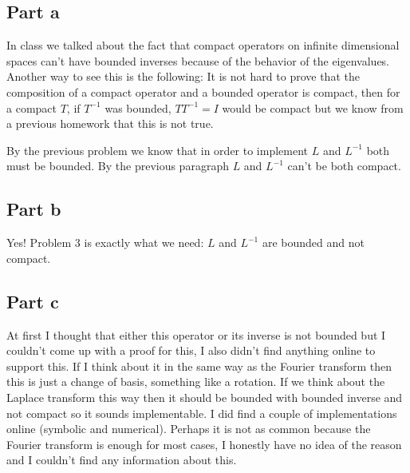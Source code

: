 \documentclass[12pt]{article}%
\begin{document}
\subsection*{Part a}
In class we talked about the fact that compact operators on infinite
dimensional spaces can't have bounded inverses because of the behavior of the
eigenvalues. Another way to see this is the following: It is not hard to prove
that the composition of a compact operator and a bounded operator is compact,
then for a compact $T$, if $T^{-1}$ was bounded, $TT^{-1}=I$ would be compact
but we know from a previous homework that this is not true.

By the previous problem we know that in order to implement $L$ and $L^{-1}$
both must be bounded. By the previous paragraph $L$ and $L^{-1}$ can't be both
compact.
\subsection*{Part b}
Yes! Problem 3 is exactly what we need: $L$ and $L^{-1}$ are bounded and not
compact.
\subsection*{Part c}
At first I thought that either this operator or its inverse is not bounded but
I couldn't come up with a proof for this, I also didn't find anything online to
support this. If I think about it in the same way as the Fourier transform then
this is just a change of basis, something like a rotation. If we think about
the Laplace transform this way then it should be bounded with bounded inverse
and not compact so it sounds implementable. I did find a couple of
implementations online (symbolic and numerical). Perhaps it is not as common
because the Fourier transform is enough for most cases, I honestly have no idea
of the reason and I couldn't find any information about this.
\end{document}
